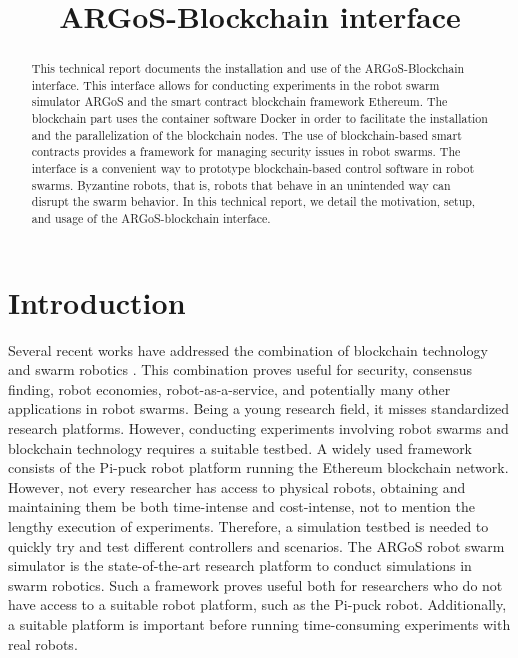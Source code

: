 \documentclass{article}
\title{ARGoS-Blockchain interface}
\begin{document}
\maketitle

\begin{abstract}
  This technical report documents the installation and use of the
  ARGoS-Blockchain interface. This interface allows for conducting
  experiments in the robot swarm simulator ARGoS and the smart
  contract blockchain framework Ethereum. The blockchain part uses the
  container software Docker in order to facilitate the installation
  and the parallelization of the blockchain nodes. The use of
  blockchain-based smart contracts provides a framework for managing
  security issues in robot swarms. The interface is a convenient way
  to prototype blockchain-based control software in robot
  swarms. Byzantine robots, that is, robots that behave in an
  unintended way can disrupt the swarm behavior. In this technical
  report, we detail the motivation, setup, and usage of the
  ARGoS-blockchain interface.
\end{abstract}

\section{Introduction}

Several recent works have addressed the combination of blockchain
technology and swarm robotics
\cite{StrCasDor2018:aamas,StrDor2018:ants,StrFerDor2017:techreport-013,Cas2016:arxiv,PacStrDor2020:techreport-001,PacStrDor2020:techreport-007}. This
combination proves useful for security, consensus finding, robot
economies, robot-as-a-service, and potentially many other applications
in robot swarms. Being a young research field, it misses standardized
research platforms. However, conducting experiments involving robot
swarms and blockchain technology requires a suitable testbed. A widely
used framework consists of the Pi-puck robot platform running the
Ethereum blockchain network. However, not every researcher has access
to physical robots, obtaining and maintaining them be both
time-intense and cost-intense, not to mention the lengthy execution of
experiments. Therefore, a simulation testbed is needed to quickly try
and test different controllers and scenarios. The ARGoS robot swarm
simulator \citep{PinTriOGr-etal2012:si} is the state-of-the-art
research platform to conduct simulations in swarm robotics. Such a
framework proves useful both for researchers who do not have access to
a suitable robot platform, such as the Pi-puck robot. Additionally, a
suitable platform is important before running time-consuming
experiments with real robots.
\end{document}
